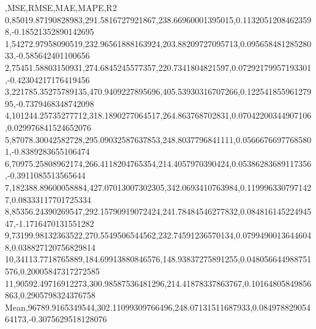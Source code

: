,MSE,RMSE,MAE,MAPE,R2
0,85019.87190828983,291.5816727921867,238.66960001395015,0.11320512084623598,-0.18521352890142695
1,54272.97958090519,232.96561888163924,203.88209727095713,0.09565848128528033,-0.585642401100656
2,75451.58803150931,274.6845245577357,220.7341804821597,0.07292179957193301,-0.42304217176419456
3,221785.35275789135,470.9409227895696,405.53930316707266,0.12254185596127995,-0.7379468348742098
4,101244.25735277712,318.1890277064517,264.863768702831,0.07042200344907106,0.029976841524652076
5,87078.30042582728,295.09032587637853,248.8037796841111,0.05666766977685801,-0.8389283655106474
6,70975.25808962174,266.4118204765354,214.4057970390424,0.05386283689117356,-0.3911085513565644
7,182388.89600058884,427.07013007302305,342.0693410763984,0.1199963307971427,0.08333117701725334
8,85356.24390269547,292.15790919072424,241.78484546277832,0.08481614522494547,-1.1716470131551282
9,73199.98132363522,270.5549506544562,232.74591236570134,0.07994900136446048,0.038827120756829814
10,34113.7718765889,184.69913880846576,148.93837275891255,0.048056644988751576,0.20005847317272585
11,90592.49716912273,300.98587536481296,214.41878337863767,0.10164805849856863,0.2905798324376758
Mean,96789.9165349544,302.11099309766496,248.07131511687933,0.08497882905464173,-0.3075629518128076

